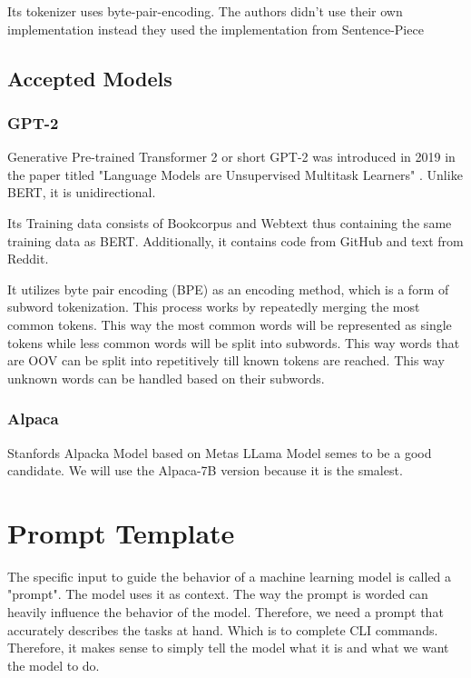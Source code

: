 Its tokenizer uses byte-pair-encoding\cite{touvron2023llama}. The authors didn't use their own implementation instead they used the implementation from Sentence-Piece \cite{kudo2018sentencepiece}




\subsection{Accepted Models}

\subsubsection{GPT-2}
Generative Pre-trained Transformer 2 or short GPT-2 was introduced in 2019 in the paper titled "Language Models are Unsupervised Multitask Learners"\cite{Radford2019LanguageMA} . Unlike BERT, it is unidirectional.

Its Training data consists of Bookcorpus and Webtext thus containing the same training data as BERT. Additionally, it contains code from GitHub and text from Reddit.


It utilizes byte pair encoding (BPE) as an encoding method, which is a form of subword tokenization. This process works by repeatedly merging the most common tokens. 
This way the most common words will be represented as single tokens while less common words will be split into subwords. This way words that are OOV can be split into repetitively till known tokens are reached. This way unknown words can be handled based on their subwords.


 


\subsubsection{Alpaca} 
Stanfords Alpacka Model based on Metas LLama Model semes to be a good candidate.
We will use the Alpaca-7B version because it is the smalest. 



\pagebreak


\pagebreak








\section{Prompt Template}


The specific input to guide the behavior of a machine learning model is called a "prompt". The model uses it as context. The way the prompt is worded can heavily influence the behavior of the model. Therefore, we need a prompt that accurately describes the tasks at hand. Which is to complete CLI commands. Therefore, it makes sense to simply tell the model what it is and what we want the model to do. 



